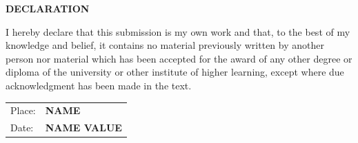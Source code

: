 \documentclass[a4paper,12pt]{report}
\begin{document}
\begin{titlepage}
    {\scshape \centering \Large \bfseries DECLARATION \par}
    \vspace{1.5cm}
    { I hereby declare that this submission is my own work and that, to the best of my knowledge and belief, it contains no material previously written by another person nor material which has been accepted for the award of any other degree or diploma of the university or other institute of higher learning, except where due acknowledgment has been made in the text.}
    \vspace{2cm}
    \vfill
    \begin{tabular}{lp{}}
        Place: & \hspace{8cm} \textbf{NAME} \\
        Date: & \hspace{5cm} \textbf{NAME VALUE} \\
    \end{tabular}
\end{titlepage}
\end{document}
